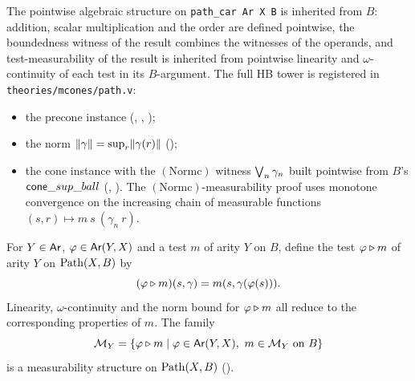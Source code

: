 The pointwise algebraic structure on \texttt{path\_car Ar X B} is
inherited from $B$: addition, scalar multiplication and the order are
defined pointwise, the boundedness witness of the result combines the
witnesses of the operands, and test-measurability of the result is
inherited from pointwise linearity and $\omega$-continuity of each
test in its $B$-argument. The full HB tower is registered in
\texttt{theories/mcones/path.v}\rocqok:
\begin{itemize}
  \item the precone instance
    (,
    ,
    );
  \item the norm $\lVert \gamma \rVert = \sup_r \lVert \gamma(r) \rVert$
    ();
  \item the cone instance with the $(\mathrm{Normc})$ witness
    $\bigvee_n \gamma_n$ built pointwise from $B$'s $\mathsf{cone}\_sup\_ball$
    (,
    ). The
    $(\mathrm{Normc})$-measurability proof uses monotone convergence
    on the increasing chain of measurable functions
    $(s, r) \mapsto m\ s\ (\gamma_n\ r)$.
\end{itemize}

\begin{definition}\label{def:path-test}
  \rocqok
  For $Y \in \mathsf{Ar}$, $\varphi \in \mathsf{Ar}(Y, X)$ and a test $m$ of arity
  $Y$ on $B$, define the test $\varphi \mathbin{\triangleright} m$ of arity $Y$
  on $\mathrm{Path}(X, B)$ by
  \[
    (\varphi \mathbin{\triangleright} m)(s, \gamma) = m(s, \gamma(\varphi(s))) .
  \]
  Linearity, $\omega$-continuity and the norm bound for $\varphi
  \mathbin{\triangleright} m$ all reduce to the corresponding properties of $m$.
  The family
  \[
    \mathcal{M}_Y = \{ \varphi \mathbin{\triangleright} m \mid
      \varphi \in \mathsf{Ar}(Y, X),\ m \in \mathcal{M}_Y \text{ on } B \}
  \]
  is a measurability structure on $\mathrm{Path}(X, B)$
  ().\rocqok
\end{definition}

